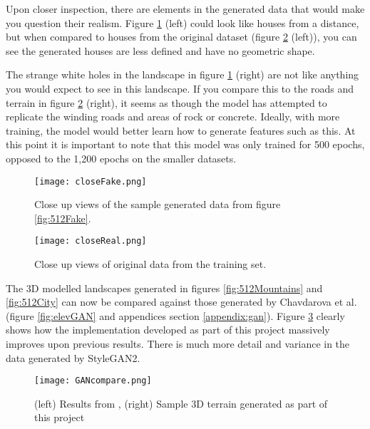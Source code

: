\documentclass[a4paper]{report}
\begin{document}
Upon closer inspection, there are elements in the generated data that would make you question their realism. Figure \ref{fig:fakeMistake} (left) could look like houses from a distance, but when compared to houses from the original dataset (figure \ref{fig:realDeal} (left)), you can see the generated houses are less defined and have no geometric shape.

The strange white holes in the landscape in figure \ref{fig:fakeMistake} (right) are not like anything you would expect to see in this landscape. If you compare this to the roads and terrain in figure \ref{fig:realDeal} (right), it seems as though the model has attempted to replicate the winding roads and areas of rock or concrete. Ideally, with more training, the model would better learn how to generate features such as this. At this point it is important to note that this model was only trained for 500 epochs, opposed to the 1,200 epochs on the smaller datasets.

\begin{figure}[H]
    \centering
        \texttt{[image: closeFake.png]}
        \caption{Close up views of the sample generated data from figure \ref{fig:512Fake}.}
        \label{fig:fakeMistake}
\end{figure}

\begin{figure}[H]
    \centering
        \texttt{[image: closeReal.png]}
        \caption{Close up views of original data from the training set.}
        \label{fig:realDeal}
\end{figure}

The 3D modelled landscapes generated in figures \ref{fig:512Mountains} and \ref{fig:512City} can now be compared against those generated by Chavdarova et al. \cite{ganTerrain} (figure \ref{fig:elevGAN} and appendices section \ref{appendix:gan}). Figure \ref{fig:GANcompare} clearly shows how the implementation developed as part of this project massively improves upon previous results. There is much more detail and variance in the data generated by StyleGAN2. 

\begin{figure}[H]
    \centering
        \texttt{[image: GANcompare.png]}
        \caption{(left) Results from \cite{ganTerrain}, (right) Sample 3D terrain generated as part of this project}
        \label{fig:GANcompare}
\end{figure}
\end{document}
